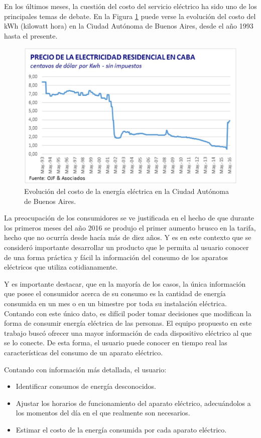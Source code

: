 En los últimos meses, la cuestión del costo del servicio eléctrico ha sido uno de los principales temas de debate. En la Figura \ref{fig:costo_caba} puede verse la evolución del costo del kWh (kilowatt hora) en la Ciudad Autónoma de Buenos Aires, desde el año 1993 hasta el presente.

\begin{figure}[h]
	\centering
	\includegraphics[width=12cm]{./Figures/1_1_costo_electricidad_caba.png}
	\caption{Evolución del costo de la energía eléctrica en la Ciudad Autónoma de Buenos Aires.}
	\label{fig:costo_caba}
\end{figure}

La preocupación de los consumidores se ve justificada en el hecho de que durante los primeros meses del año 2016 se produjo el primer aumento brusco en la tarifa, hecho que no ocurría desde hacía más de diez años. Y es en este contexto que se consideró importante desarrollar un producto que le permita al usuario conocer de una forma práctica y fácil la información del consumo de los aparatos eléctricos que utiliza cotidianamente. 

Y es importante destacar, que en la mayoría de los casos, la única información que posee el consumidor acerca de su consumo es la cantidad de energía consumida en un mes o en un bimestre por toda su instalación eléctrica. Contando con este único dato, es difícil poder tomar decisiones que modifican la forma de consumir energía eléctrica de las personas. El equipo propuesto en este trabajo buscó ofrecer una mayor información de cada dispositivo eléctrico al que se lo conecte. De esta forma, el usuario puede conocer en tiempo real las características del consumo de un aparato eléctrico.

Contando con información más detallada, el usuario:
\begin{itemize}
\item Identificar consumos de energía desconocidos.
\item Ajustar los horarios de funcionamiento del aparato eléctrico, adecuándolos a los momentos del día en el que realmente son necesarios.
\item Estimar el costo de  la energía consumida por cada aparato eléctrico.
\end{itemize}

